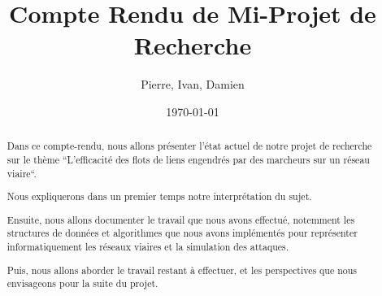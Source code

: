 \documentclass[a4paper, 11pt]{article}
\title{Compte Rendu de Mi-Projet de Recherche}
\author{Pierre, Ivan, Damien}
\date{\today}
\begin{document}
\maketitle


\begin{abstract}
Dans ce compte-rendu, nous allons présenter l'état actuel de notre projet de recherche sur le thème ``L'efficacité des flots de liens engendrés par des marcheurs sur un réseau viaire``.

Nous expliquerons dans un premier temps notre interprétation du sujet.

Ensuite, nous allons documenter le travail que nous avons effectué, notemment les structures de données et algorithmes que nous avons implémentés pour représenter informatiquement les réseaux viaires et la simulation des attaques.

Puis, nous allons aborder le travail restant à effectuer, et les perspectives que nous envisageons pour la suite du projet.
\end{abstract}

\tableofcontents











\end{document}
